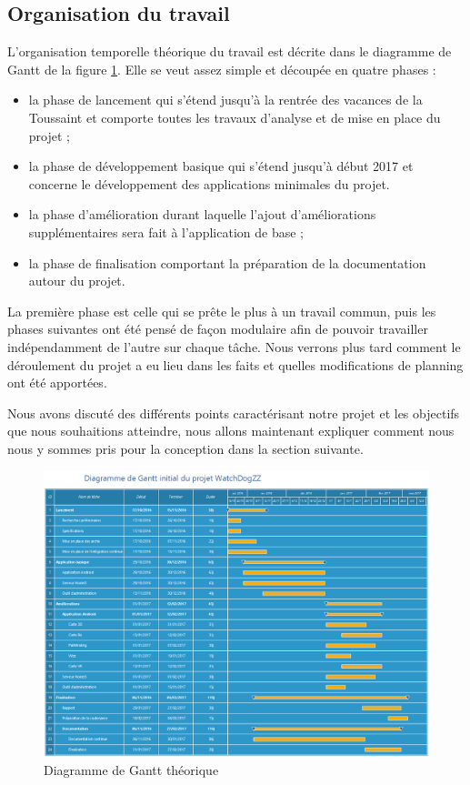 \subsection{Organisation du travail}

L'organisation temporelle théorique du travail est décrite dans le diagramme de Gantt de la figure \ref{ganttinit}. Elle se veut assez simple et découpée en quatre phases :

\begin{itemize}
    \item la phase de lancement qui s’étend jusqu’à la rentrée des vacances de la Toussaint et comporte toutes les travaux d’analyse et de mise en place du projet ;
    \item la phase de développement basique qui s’étend jusqu’à début 2017 et concerne le développement des applications minimales du projet.
    \item la phase d’amélioration durant laquelle l’ajout d’améliorations supplémentaires sera fait à l’application de base ;
    \item la phase de finalisation comportant la préparation de la documentation autour du projet.
\end{itemize}

La première phase est celle qui se prête le plus à un travail commun, puis les phases suivantes ont été pensé de façon modulaire afin de pouvoir travailler indépendamment de l’autre sur chaque tâche. Nous verrons plus tard comment le déroulement du projet a eu lieu dans les faits et quelles modifications de planning ont été apportées.

Nous avons discuté des différents points caractérisant notre projet et les objectifs que nous souhaitions atteindre, nous allons maintenant expliquer comment nous nous y sommes pris pour la conception dans la section suivante.

\begin{landscape}
    \begin{figure}[h]
        \centering
        \includegraphics[height=\textwidth]{../gantt_initial.png}
        \caption{Diagramme de Gantt théorique}
        \label{ganttinit}
    \end{figure}
\end{landscape}
